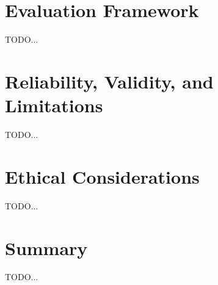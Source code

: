 \section{Evaluation Framework}
TODO...

\section{Reliability, Validity, and Limitations}
TODO...

\section{Ethical Considerations}
TODO...

\section{Summary}
TODO...
